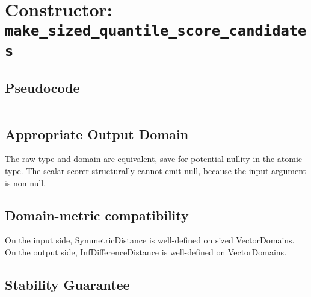 % 

\section{Constructor: \texttt{make\_sized\_quantile\_score\_candidates}}

\subsection{Pseudocode}
\label{sec:sized-python-pseudocode}
\inputminted{python}{./pseudocode/make_sized_quantile_score_candidates.py}

\subsection{Appropriate Output Domain}
The raw type and domain are equivalent, save for potential nullity in the atomic type. 
The scalar scorer structurally cannot emit null, because the input argument is non-null.

\subsection{Domain-metric compatibility}
On the input side, SymmetricDistance is well-defined on sized VectorDomains. 
On the output side, InfDifferenceDistance is well-defined on VectorDomains.

\subsection{Stability Guarantee}


